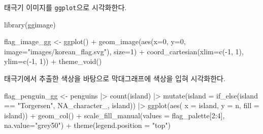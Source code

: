 \documentclass[
  letterpaper,
]{book}
\newenvironment{Shaded}{\begin{snugshade}}{\end{snugshade}}
\newcommand{\AttributeTok}[1]{\textcolor[rgb]{0.40,0.45,0.13}{#1}}
\newcommand{\ConstantTok}[1]{\textcolor[rgb]{0.56,0.35,0.01}{#1}}
\newcommand{\DecValTok}[1]{\textcolor[rgb]{0.68,0.00,0.00}{#1}}
\newcommand{\FunctionTok}[1]{\textcolor[rgb]{0.28,0.35,0.67}{#1}}
\newcommand{\NormalTok}[1]{\textcolor[rgb]{0.00,0.23,0.31}{#1}}
\newcommand{\OtherTok}[1]{\textcolor[rgb]{0.00,0.23,0.31}{#1}}
\newcommand{\SpecialCharTok}[1]{\textcolor[rgb]{0.37,0.37,0.37}{#1}}
\newcommand{\StringTok}[1]{\textcolor[rgb]{0.13,0.47,0.30}{#1}}
\begin{document}
태극기 이미지를 \texttt{ggplot}으로 시각화한다.

\begin{Shaded}
\begin{Highlighting}[]
\FunctionTok{library}\NormalTok{(ggimage)}

\NormalTok{flag\_image\_gg }\OtherTok{\textless{}{-}} \FunctionTok{ggplot}\NormalTok{() }\SpecialCharTok{+}
  \FunctionTok{geom\_image}\NormalTok{(}\FunctionTok{aes}\NormalTok{(}\AttributeTok{x=}\DecValTok{0}\NormalTok{, }\AttributeTok{y=}\DecValTok{0}\NormalTok{, }\AttributeTok{image=}\StringTok{"images/korean\_flag.svg"}\NormalTok{), }\AttributeTok{size=}\DecValTok{1}\NormalTok{) }\SpecialCharTok{+}
  \FunctionTok{coord\_cartesian}\NormalTok{(}\AttributeTok{xlim=}\FunctionTok{c}\NormalTok{(}\SpecialCharTok{{-}}\DecValTok{1}\NormalTok{, }\DecValTok{1}\NormalTok{), }\AttributeTok{ylim=}\FunctionTok{c}\NormalTok{(}\SpecialCharTok{{-}}\DecValTok{1}\NormalTok{, }\DecValTok{1}\NormalTok{)) }\SpecialCharTok{+}
  \FunctionTok{theme\_void}\NormalTok{()  }
\end{Highlighting}
\end{Shaded}

태극기에서 추출한 색상을 바탕으로 막대그래프에 색상을 입혀 시각화한다.

\begin{Shaded}
\begin{Highlighting}[]
\NormalTok{flag\_penguin\_gg }\OtherTok{\textless{}{-}}\NormalTok{ penguins }\SpecialCharTok{|\textgreater{}} 
  \FunctionTok{count}\NormalTok{(island) }\SpecialCharTok{|\textgreater{}} 
  \FunctionTok{mutate}\NormalTok{(}\AttributeTok{island =} \FunctionTok{if\_else}\NormalTok{(island }\SpecialCharTok{==}  \StringTok{"Torgersen"}\NormalTok{, }\ConstantTok{NA\_character\_}\NormalTok{, island)) }\SpecialCharTok{|\textgreater{}} 
  \FunctionTok{ggplot}\NormalTok{(}\FunctionTok{aes}\NormalTok{( }\AttributeTok{x =}\NormalTok{ island, }\AttributeTok{y =}\NormalTok{ n, }\AttributeTok{fill =}\NormalTok{ island)) }\SpecialCharTok{+}
    \FunctionTok{geom\_col}\NormalTok{() }\SpecialCharTok{+}
    \FunctionTok{scale\_fill\_manual}\NormalTok{(}\AttributeTok{values =}\NormalTok{ flag\_palette[}\DecValTok{2}\SpecialCharTok{:}\DecValTok{4}\NormalTok{], }\AttributeTok{na.value=}\StringTok{"grey50"}\NormalTok{) }\SpecialCharTok{+}
    \FunctionTok{theme}\NormalTok{(}\AttributeTok{legend.position =} \StringTok{"top"}\NormalTok{)}
\end{Highlighting}
\end{Shaded}
\end{document}
